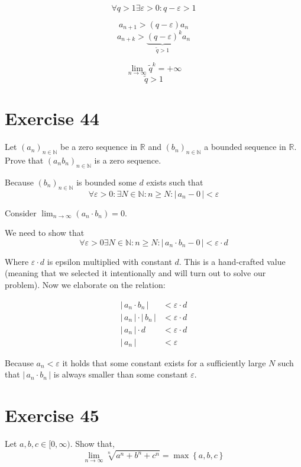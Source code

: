 \documentclass[a4paper]{article}
\theoremstyle{definition}
\newcommand\set[1]{\left\{#1\right\}}
\newcommand\card[1]{\left|\,#1\,\right|}
\begin{document}
\[ \forall q > 1 \exists \varepsilon > 0: q - \varepsilon > 1 \]

\[ a_{n+1} > (q - \varepsilon) a_n \]
\[ a_{n+k} > {\underbrace{(q - \varepsilon)}_{\tilde q > 1}}^k a_n \]

\[ \lim_{n\to\infty} \tilde q^k = +\infty \]
\[ \tilde q > 1 \]

\section{Exercise 44}
\begin{ex}
  Let $(a_n)_{n \in \mathbb N}$ be a zero sequence in $\mathbb R$ and $(b_n)_{n \in \mathbb N}$ a bounded sequence in $\mathbb R$.
  Prove that $(a_n b_n)_{n \in \mathbb N}$ is a zero sequence.
\end{ex}

Because $(b_n)_{n \in \mathbb N}$ is bounded some $d$ exists such that
\[ \forall \varepsilon > 0: \exists N \in \mathbb N: n \geq N: \card{a_n - 0} < \varepsilon \]

Consider $\lim_{n\to\infty} (a_n \cdot b_n) = 0$.

We need to show that
\[ \forall \varepsilon > 0 \exists N \in \mathbb N: n \geq N: \card{a_n \cdot b_n - 0} < \varepsilon \cdot d \]

Where $\varepsilon \cdot d$ is epsilon multiplied with constant $d$.
This is a hand-crafted value (meaning that we selected it intentionally and will turn out to solve our problem). Now we elaborate on the relation:

\begin{align*}
  \card{a_n \cdot b_n} &< \varepsilon \cdot d \\
  \card{a_n} \cdot \card{b_n} &< \varepsilon \cdot d \\
  \card{a_n} \cdot d &< \varepsilon \cdot d \\
  \card{a_n} &< \varepsilon
\end{align*}

Because $a_n < \varepsilon$ it holds that some constant exists for a sufficiently large $N$ such that $\card{a_n \cdot b_n}$ is always smaller than some constant $\varepsilon$.

\section{Exercise 45}
\begin{ex}
  Let $a,b,c \in [0,\infty)$. Show that,
  \[ \lim_{n\to\infty} \sqrt[n]{a^n + b^n + c^n} = \max\set{a,b,c} \]
\end{ex}
\end{document}
